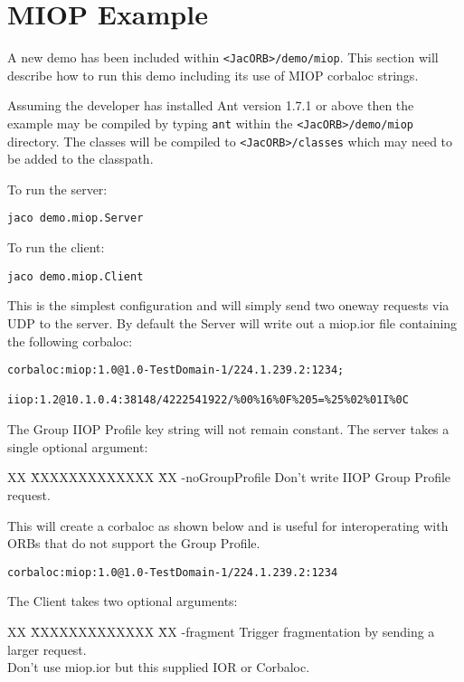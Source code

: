 \section{MIOP Example}

A new demo has been included within {\tt <JacORB>/demo/miop}. This section will
describe how to run this demo including its use of MIOP corbaloc strings.

Assuming the developer has installed Ant {\small version 1.7.1} or above then
the example may be compiled by typing {\tt ant} within the {\tt <JacORB>/demo/miop}
directory. The classes will be compiled to {\tt <JacORB>/classes} which may
need to be added to the classpath.


To run the server:
\begin{small}
\begin{verbatim}
jaco demo.miop.Server
\end{verbatim}
\end{small}

To run the client:
\begin{small}
\begin{verbatim}
jaco demo.miop.Client
\end{verbatim}
\end{small}

This is the simplest configuration and will simply send two oneway requests via
UDP to the server. By default the Server will write out a miop.ior file
containing the following corbaloc:

\begin{verbatim}
corbaloc:miop:1.0@1.0-TestDomain-1/224.1.239.2:1234;
         iiop:1.2@10.1.0.4:38148/4222541922/%00%16%0F%205=%25%02%01I%0C
\end{verbatim}
The Group IIOP Profile key string will not remain constant. The server takes a
single optional argument:
\begin{tabbing}
XX \= XXXXXXXXXXXXX \= XX \kill
\>  -noGroupProfile \>  Don't write IIOP Group Profile
request.\\
\end{tabbing}
This will create a corbaloc as shown below and is useful for interoperating
with ORBs that do not support the Group Profile.
\begin{verbatim}
corbaloc:miop:1.0@1.0-TestDomain-1/224.1.239.2:1234
\end{verbatim}


The Client takes two optional arguments:
\begin{tabbing}
XX \= XXXXXXXXXXXXX \= XX \kill
\>  -fragment \>  Trigger fragmentation by sending a larger request.\\
 \> Don't use miop.ior but this supplied IOR or Corbaloc.\\
\end{tabbing}

